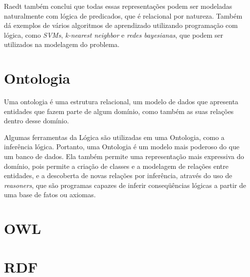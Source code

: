 Raedt também conclui que todas essas representações podem ser modeladas naturalmente com lógica de predicados, que é relacional por natureza. Também dá exemplos de vários algoritmos de aprendizado utilizando programação com lógica,
como \textit{SVMs}, \textit{k-nearest neighbor} e \textit{redes bayesianas}, que podem ser utilizados na modelagem do problema.

\section{Ontologia}
\label{sec:ontologia}

Uma ontologia é uma estrutura relacional, um modelo de dados que apresenta entidades que fazem parte de algum domínio, como também as suas relações dentro desse domínio.

Algumas ferramentas da Lógica são utilizadas em uma Ontologia, como a inferência lógica. Portanto, uma Ontologia é um modelo mais poderoso do que um banco de dados. Ela também permite uma representação mais expressiva do domínio, pois permite a criação de classes e a modelagem de relações entre entidades, e a descoberta de novas relações por inferência, através do uso de \textit{reasoners}, que são programas capazes de inferir conseqüências lógicas a partir de uma base de fatos ou axiomas.



\section{OWL}
\label{sec:owl}


\section{RDF}
\label{sec:rdf}
